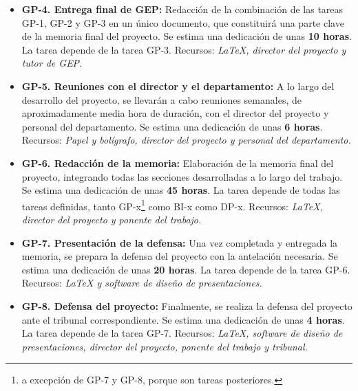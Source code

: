 \begin{itemize}
    \item \textbf{GP-4. Entrega final de GEP:} Redacción de la combinación de las tareas GP-1, GP-2 y GP-3 en un único documento, 
    que constituirá una parte clave de la memoria final del proyecto. Se estima una dedicación de unas \textbf{10 horas}. 
    \newline La tarea depende de la tarea GP-3.
    \newline Recursos: \textit {LaTeX, director del proyecto y tutor de GEP.}
    
    \item \textbf{GP-5. Reuniones con el director y el departamento:} A lo largo del desarrollo del proyecto, se llevarán 
    a cabo reuniones semanales, de aproximadamente media hora de duración, con el director del proyecto y personal del 
    departamento. Se estima una dedicación de unas \textbf{6 horas}. 
    \newline Recursos: \textit {Papel y bolígrafo, director del proyecto y personal del departamento.}
    
    \item \textbf{GP-6. Redacción de la memoria:} Elaboración de la memoria final del proyecto, integrando todas las secciones
    desarrolladas a lo largo del trabajo. Se estima una dedicación de unas \textbf{45 horas}.
    \newline La tarea depende de todas las tareas definidas, tanto GP-x\footnote{a excepción de GP-7 y GP-8, porque son tareas 
    posteriores.} como BI-x como DP-x.
    \newline Recursos: \textit {LaTeX, director del proyecto y ponente del trabajo.}
    
    \item \textbf{GP-7. Presentación de la defensa:} Una vez completada y entregada la memoria, se prepara la defensa del proyecto 
    con la antelación necesaria. Se estima una dedicación de unas \textbf{20 horas}.
    \newline La tarea depende de la tarea GP-6.
    \newline Recursos: \textit {LaTeX y software de diseño de presentaciones.}
    
    \item \textbf{GP-8. Defensa del proyecto:}
    Finalmente, se realiza la defensa del proyecto ante el tribunal correspondiente. Se estima una dedicación de unas \textbf{4 horas}.
    \newline La tarea depende de la tarea GP-7.
    \newline Recursos: \textit {LaTeX, software de diseño de presentaciones, director del proyecto, ponente del trabajo y tribunal.}
\end{itemize}